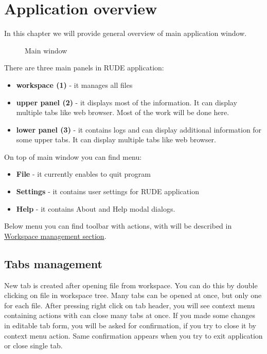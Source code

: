 \section{Application overview}\label{section:overview}

In this chapter we will provide general overview of main application window.

\begin{figure*}[!ht] 
	\centering
	\caption{Main window}
\end{figure*}

There are three main panels in RUDE application:
\begin{itemize}
	\item \textbf{workspace (1)} - it manages all files
	\item \textbf{upper panel (2)} - it displays most of the information. It can display multiple tabs like web browser. Most of the work will be done here.
	\item \textbf{lower panel (3)} - it contains logs and can display additional information for some upper tabs. It can display multiple tabs like web browser.
\end{itemize}

On top of main window you can find menu:
\begin{itemize}
	\item \textbf{File} - it currently enables to quit program
	\item \textbf{Settings} - it contains user settings for RUDE application
	\item \textbf{Help} - it contains About and Help modal dialogs.
\end{itemize}

Below menu you can find toolbar with actions, with will be described in \hyperref[section:workspace]{Workspace management section}.


\subsection{Tabs management}\label{sub:overview-tab}
New tab is created after opening file from workspace. You can do this by double clicking on file in workspace tree. Many tabs can be opened at once, but only one for each file. After pressing right click on tab header, you will see context menu containing actions with can close many tabs at once. If you made some changes in editable tab form, you will be asked for confirmation, if you try to close it by context menu action. Same confirmation appears when you try to exit application or close single tab.\\

